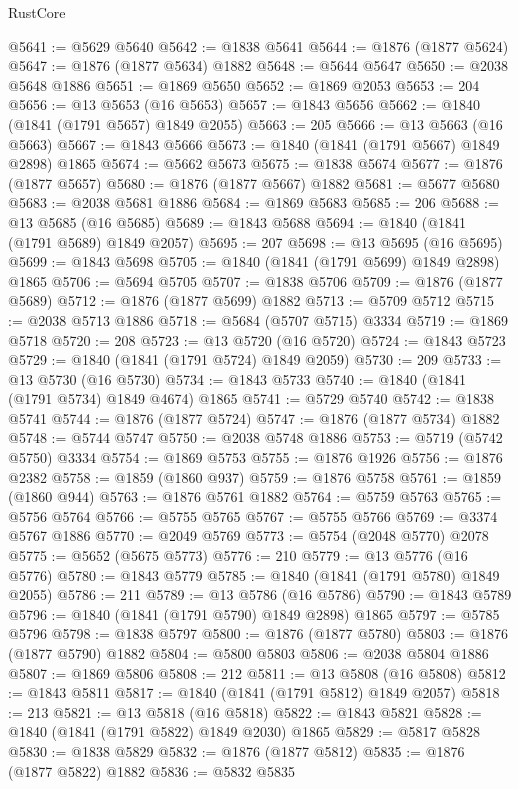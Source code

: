 \begin{lexlean}{RustCore}
\begin{coremodule}
@5641 := @5629 @5640
@5642 := @1838 @5641
@5644 := @1876 (@1877 @5624)
@5647 := @1876 (@1877 @5634) @1882
@5648 := @5644 @5647
@5650 := @2038 @5648 @1886
@5651 := @1869 @5650
@5652 := @1869 @2053
@5653 := 204
@5656 := @13 @5653 (@16 @5653)
@5657 := @1843 @5656
@5662 := @1840 (@1841 (@1791 @5657) @1849 @2055)
@5663 := 205
@5666 := @13 @5663 (@16 @5663)
@5667 := @1843 @5666
@5673 := @1840 (@1841 (@1791 @5667) @1849 @2898) @1865
@5674 := @5662 @5673
@5675 := @1838 @5674
@5677 := @1876 (@1877 @5657)
@5680 := @1876 (@1877 @5667) @1882
@5681 := @5677 @5680
@5683 := @2038 @5681 @1886
@5684 := @1869 @5683
@5685 := 206
@5688 := @13 @5685 (@16 @5685)
@5689 := @1843 @5688
@5694 := @1840 (@1841 (@1791 @5689) @1849 @2057)
@5695 := 207
@5698 := @13 @5695 (@16 @5695)
@5699 := @1843 @5698
@5705 := @1840 (@1841 (@1791 @5699) @1849 @2898) @1865
@5706 := @5694 @5705
@5707 := @1838 @5706
@5709 := @1876 (@1877 @5689)
@5712 := @1876 (@1877 @5699) @1882
@5713 := @5709 @5712
@5715 := @2038 @5713 @1886
@5718 := @5684 (@5707 @5715) @3334
@5719 := @1869 @5718
@5720 := 208
@5723 := @13 @5720 (@16 @5720)
@5724 := @1843 @5723
@5729 := @1840 (@1841 (@1791 @5724) @1849 @2059)
@5730 := 209
@5733 := @13 @5730 (@16 @5730)
@5734 := @1843 @5733
@5740 := @1840 (@1841 (@1791 @5734) @1849 @4674) @1865
@5741 := @5729 @5740
@5742 := @1838 @5741
@5744 := @1876 (@1877 @5724)
@5747 := @1876 (@1877 @5734) @1882
@5748 := @5744 @5747
@5750 := @2038 @5748 @1886
@5753 := @5719 (@5742 @5750) @3334
@5754 := @1869 @5753
@5755 := @1876 @1926
@5756 := @1876 @2382
@5758 := @1859 (@1860 @937)
@5759 := @1876 @5758
@5761 := @1859 (@1860 @944)
@5763 := @1876 @5761 @1882
@5764 := @5759 @5763
@5765 := @5756 @5764
@5766 := @5755 @5765
@5767 := @5755 @5766
@5769 := @3374 @5767 @1886
@5770 := @2049 @5769
@5773 := @5754 (@2048 @5770) @2078
@5775 := @5652 (@5675 @5773)
@5776 := 210
@5779 := @13 @5776 (@16 @5776)
@5780 := @1843 @5779
@5785 := @1840 (@1841 (@1791 @5780) @1849 @2055)
@5786 := 211
@5789 := @13 @5786 (@16 @5786)
@5790 := @1843 @5789
@5796 := @1840 (@1841 (@1791 @5790) @1849 @2898) @1865
@5797 := @5785 @5796
@5798 := @1838 @5797
@5800 := @1876 (@1877 @5780)
@5803 := @1876 (@1877 @5790) @1882
@5804 := @5800 @5803
@5806 := @2038 @5804 @1886
@5807 := @1869 @5806
@5808 := 212
@5811 := @13 @5808 (@16 @5808)
@5812 := @1843 @5811
@5817 := @1840 (@1841 (@1791 @5812) @1849 @2057)
@5818 := 213
@5821 := @13 @5818 (@16 @5818)
@5822 := @1843 @5821
@5828 := @1840 (@1841 (@1791 @5822) @1849 @2030) @1865
@5829 := @5817 @5828
@5830 := @1838 @5829
@5832 := @1876 (@1877 @5812)
@5835 := @1876 (@1877 @5822) @1882
@5836 := @5832 @5835

\end{coremodule}
\end{lexlean}
